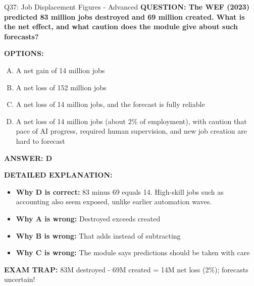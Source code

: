 \documentclass[8pt]{beamer}
\begin{document}
\begin{frame}[shrink=6]{Q37: Job Displacement Figures - Advanced}
\fontsize{6.5}{7.5}\selectfont
\textbf{QUESTION: The WEF (2023) predicted 83 million jobs destroyed and 69 million created. What is the net effect, and what caution does the module give about such forecasts?}

\vspace{0.1cm}
\textbf{OPTIONS:}
\begin{enumerate}[A.]
\item A net gain of 14 million jobs
\item A net loss of 152 million jobs
\item A net loss of 14 million jobs, and the forecast is fully reliable
\item A net loss of 14 million jobs (about 2\% of employment), with caution that pace of AI progress, required human supervision, and new job creation are hard to forecast
\end{enumerate}

\vspace{0.1cm}
\textcolor{myblue}{\textbf{ANSWER: D}}

\vspace{0.1cm}
\textbf{DETAILED EXPLANATION:}
\begin{itemize}
\item \textbf{Why D is correct:} 83 minus 69 equals 14. High-skill jobs such as accounting also seem exposed, unlike earlier automation waves.
\item \textbf{Why A is wrong:} Destroyed exceeds created
\item \textbf{Why B is wrong:} That adds instead of subtracting
\item \textbf{Why C is wrong:} The module says predictions should be taken with care
\end{itemize}

\textcolor{myred}{\textbf{EXAM TRAP:}} 83M destroyed - 69M created = 14M net loss (2\%); forecasts uncertain!
\end{frame}

\end{document}
